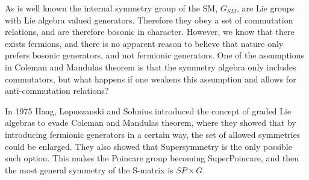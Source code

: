 As is well known the internal symmetry group of the SM, $G_{SM}$,  are Lie groups with Lie algebra valued generators. Therefore they obey a set of commutation relations, and are therefore bosonic in character. However, we know that there exists fermions, and there is no apparent reason to believe that nature only prefers bosonic generators, and not fermionic generators. One of the assumptions in Coleman and Mandulas theorem is that the symmetry algebra only includes commutators, but what happens if one weakens this assumption and allows for anti-commutation relations?

In 1975 Haag, Lopuszanski and Sohnius introduced the concept of graded Lie algebras to evade Coleman and Mandulas theorem, where they showed that by introducing fermionic generators in a certain way, the set of allowed symmetries could be enlarged. They also showed that Supersymmetry is the only possible such option. This makes the Poincare group becoming SuperPoincare, and then the most general symmetry of the S-matrix is $SP\times G$.

